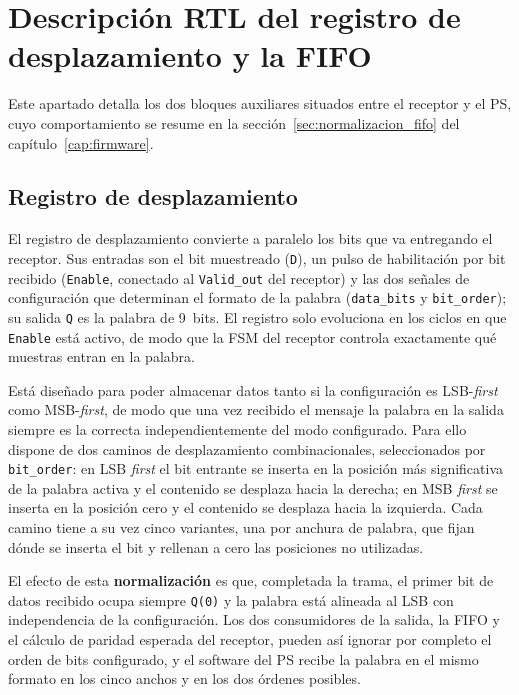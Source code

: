 \section{Descripción RTL del registro de desplazamiento y la FIFO} \label{anxC:rtl_fifo}

Este apartado detalla los dos bloques auxiliares situados entre el receptor y el PS, cuyo
comportamiento se resume en la sección~\ref{sec:normalizacion_fifo} del capítulo~\ref{cap:firmware}.

\subsection{Registro de desplazamiento}

El registro de desplazamiento convierte a paralelo los bits que va entregando el receptor. Sus
entradas son el bit muestreado (\texttt{D}), un pulso de habilitación por bit recibido
(\texttt{Enable}, conectado al \texttt{Valid\_out} del receptor) y las dos señales de configuración
que determinan el formato de la palabra (\texttt{data\_bits} y \texttt{bit\_order}); su salida
\texttt{Q} es la palabra de 9~bits. El registro solo evoluciona en los ciclos en que
\texttt{Enable} está activo, de modo que la FSM del receptor controla exactamente qué muestras
entran en la palabra.

Está diseñado para poder almacenar datos tanto si la configuración es LSB-\textit{first} como
MSB-\textit{first}, de modo que una vez recibido el mensaje la palabra en la salida siempre es la
correcta independientemente del modo configurado. Para ello dispone de dos caminos de
desplazamiento combinacionales, seleccionados por \texttt{bit\_order}: en LSB \textit{first} el
bit entrante se inserta en la posición más significativa de la palabra activa y el contenido se
desplaza hacia la derecha; en MSB \textit{first} se inserta en la posición cero y el contenido se
desplaza hacia la izquierda. Cada camino tiene a su vez cinco variantes, una por anchura de
palabra, que fijan dónde se inserta el bit y rellenan a cero las posiciones no utilizadas.

El efecto de esta \textbf{normalización} es que, completada la trama, el primer bit de datos
recibido ocupa siempre \texttt{Q(0)} y la palabra está alineada al LSB con independencia de la
configuración. Los dos consumidores de la salida, la FIFO y el cálculo de paridad esperada del
receptor, pueden así ignorar por completo el orden de bits configurado, y el software del PS
recibe la palabra en el mismo formato en los cinco anchos y en los dos órdenes posibles.

